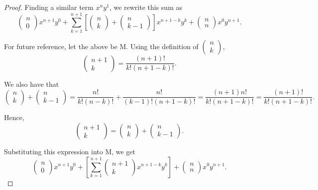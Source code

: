 \documentclass[11pt]{article}
\begin{document}
\begin{enumerate}
\begin{proof}
Finding a similar term $x^ny^1$, we rewrite this sum as
\[
\left(\begin{array}{c} n\\ 0\end{array}\right)x^{n+1} y^0 + \sum_{k=1}^{n+1}  \left[\left(\begin{array}{c} n\\ k\end{array}\right) + \left(\begin{array}{c} n\\ k-1\end{array}\right)\right] x^{n+1-k}y^k + \left(\begin{array}{c} n\\ n\end{array}\right)x^0y^{n+1}.
\]


For future reference, let the above be M. Using the definition of $\left(\begin{array}{c} n\\ k\end{array}\right)$,
\[
\left(\begin{array}{c} n+1\\ k\end{array}\right) = \frac{(n+1)!}{k! (n+1-k)!}.
\]

We also have that
\[
\left(\begin{array}{c} n\\ k\end{array}\right) + \left(\begin{array}{c} n\\ k-1\end{array}\right) = \frac{n!}{k! (n-k)!} + \frac{n!}{(k-1)! (n+1-k)!} = \frac{(n+1)n!}{k!(n+1-k)!} = \frac{(n+1)!}{k!(n+1-k)!}.
\]

Hence, 
\[
\left(\begin{array}{c} n+1\\ k\end{array}\right) = \left(\begin{array}{c} n\\ k\end{array}\right) + \left(\begin{array}{c} n\\ k-1\end{array}\right).
\]

Substituting this expression into M, we get 
\[
\left(\begin{array}{c} n\\ 0\end{array}\right)x^{n+1} y^0 + \left[\sum_{k=1}^{n+1}  \left(\begin{array}{c} n+1\\ k\end{array}\right) x^{n+1-k}y^k\right] + \left(\begin{array}{c} n\\ n\end{array}\right)x^0y^{n+1}.
\]


\end{proof}
\end{enumerate}
\end{document}
